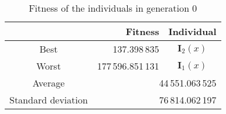 \begin{table}[ht!]
  \centering
  \begin{tabular}{|c|r|c|}
    \hline
    	& \textbf{Fitness}	& \textbf{Individual}	\\
    \hline
    Best	& 137.398\,835	& \(\mathbf{I}_2(x)\)	\\
    Worst	& 177\,596.851\,131	& \(\mathbf{I}_1(x)\)	\\
    \hline
    \hline
    Average	& \multicolumn{2}{r|}{44\,551.063\,525}	\\
    \hline
    Standard deviation	& \multicolumn{2}{r|}{76\,814.062\,197}	\\
    \hline
  \end{tabular}
  \caption{Fitness of the individuals in generation 0}
  \label{tab:bg:gp:sym:init:pop:summary}
\end{table}